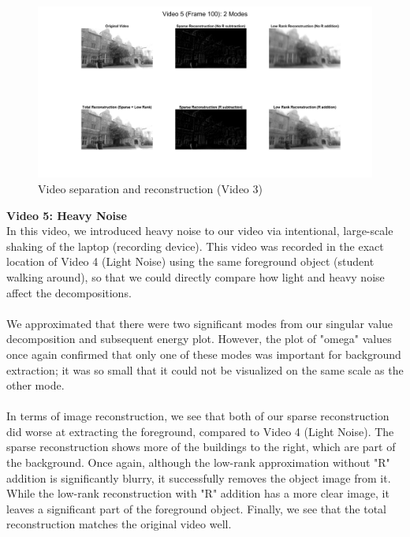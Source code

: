\documentclass{article}
\begin{document}
\begin{figure}[H]
\begin{center}
\includegraphics[width = 16cm]{vid5image}
\caption{\label{fig:scaled_diss} Video separation and reconstruction (Video 3)}
\end{center}
\end{figure}
\textbf{Video 5: Heavy Noise} \\
In this video, we introduced heavy noise to our video via intentional, large-scale shaking of the laptop (recording device). This video was recorded in the exact location of Video 4 (Light Noise) using the same foreground object (student walking around), so that we could directly compare how light and heavy noise affect the decompositions. \\ \\
We approximated that there were two significant modes from our singular value decomposition and subsequent energy plot. However, the plot of "omega" values once again confirmed that only one of these modes was important for background extraction; it was so small that it could not be visualized on the same scale as the other mode. \\ \\
In terms of image reconstruction, we see that both of our sparse reconstruction did worse at extracting the foreground, compared to Video 4 (Light Noise). The sparse reconstruction shows more of the buildings to the right, which are part of the background. Once again, although the low-rank approximation without "R" addition is significantly blurry, it successfully removes the object image from it. While the low-rank reconstruction with "R" addition has a more clear image, it leaves a significant part of the foreground object. Finally, we see that the total reconstruction matches the original video well.
\end{document}

